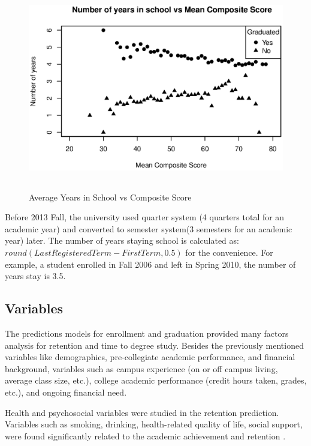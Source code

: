 \documentclass[12pt,english]{report}
\begin{document}
\begin{figure}[ht]
   \centering
\includegraphics[width=5in,
height=3.5in]{pic/years_in_school_vs_composite_score.eps}
 \caption{Average Years in School vs Composite Score}
 \label{years_composite}
\end{figure}

Before 2013 Fall, the university used quarter system (4 quarters total for an
academic year) and converted to semester system(3 semesters for an academic
year) later. The number of years staying school is calculated as: $round(Last
Registered Term - First Term,0.5)$ for the convenience. For example, a student
enrolled in Fall 2006 and left in Spring 2010, the number of years stay is 3.5.



\subsection{Variables}
The predictions models for enrollment and graduation provided many factors
analysis for retention and time to degree study. Besides the previously
mentioned variables like demographics, pre-collegiate academic performance, and
financial background, variables such as campus experience (on or off campus
living, average class size, etc.), college academic performance (credit hours
taken, grades, etc.), and ongoing financial need.

Health and psychosocial variables were studied in the retention prediction.
Variables such as smoking, drinking, health-related quality of life, social
support, were found significantly related to the academic achievement and
retention \citep{deberard2004predictors, maney1990predicting,
musgrave1997personality, cutrona1994perceived}.
\end{document}
